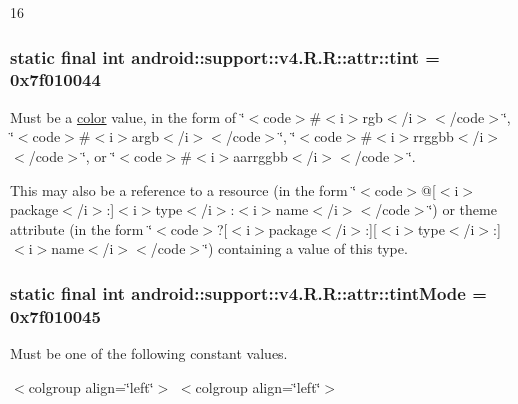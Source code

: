 16\hypertarget{classandroid_1_1support_1_1v4_1_1_r_1_1attr_f922e6d64b4da6f7142da6e2b7f26282}{
\subsubsection[{tint}]{\setlength{\rightskip}{0pt plus 5cm}static final int android::support::v4.R.R::attr::tint = 0x7f010044}}
\label{classandroid_1_1support_1_1v4_1_1_r_1_1attr_f922e6d64b4da6f7142da6e2b7f26282}


Must be a \hyperlink{classandroid_1_1support_1_1v4_1_1_r_1_1color}{color} value, in the form of \char`\"{}$<$code$>$\#$<$i$>$rgb$<$/i$>$$<$/code$>$\char`\"{}, \char`\"{}$<$code$>$\#$<$i$>$argb$<$/i$>$$<$/code$>$\char`\"{}, \char`\"{}$<$code$>$\#$<$i$>$rrggbb$<$/i$>$$<$/code$>$\char`\"{}, or \char`\"{}$<$code$>$\#$<$i$>$aarrggbb$<$/i$>$$<$/code$>$\char`\"{}. 

This may also be a reference to a resource (in the form \char`\"{}$<$code$>$@\mbox{[}$<$i$>$package$<$/i$>$:\mbox{]}$<$i$>$type$<$/i$>$:$<$i$>$name$<$/i$>$$<$/code$>$\char`\"{}) or theme attribute (in the form \char`\"{}$<$code$>$?\mbox{[}$<$i$>$package$<$/i$>$:\mbox{]}\mbox{[}$<$i$>$type$<$/i$>$:\mbox{]}$<$i$>$name$<$/i$>$$<$/code$>$\char`\"{}) containing a value of this type. \hypertarget{classandroid_1_1support_1_1v4_1_1_r_1_1attr_b7958576b98aed7197abc47345e46744}{
\subsubsection[{tintMode}]{\setlength{\rightskip}{0pt plus 5cm}static final int android::support::v4.R.R::attr::tintMode = 0x7f010045}}
\label{classandroid_1_1support_1_1v4_1_1_r_1_1attr_b7958576b98aed7197abc47345e46744}


Must be one of the following constant values. \begin{TabularC}{0}
\hline
\end{TabularC}
$<$colgroup align=\char`\"{}left\char`\"{}$>$ $<$colgroup align=\char`\"{}left\char`\"{}$>$ 

